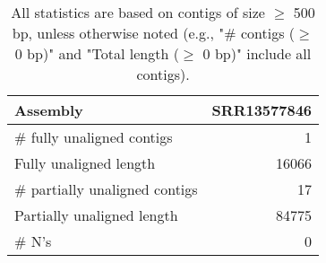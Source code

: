 \documentclass[12pt,a4paper]{article}
\begin{document}
\begin{table}[ht]
\begin{center}
\caption{All statistics are based on contigs of size $\geq$ 500 bp, unless otherwise noted (e.g., "\# contigs ($\geq$ 0 bp)" and "Total length ($\geq$ 0 bp)" include all contigs).}
\begin{tabular}{|l*{1}{|r}|}
\hline
Assembly & SRR13577846 \\ \hline
\# fully unaligned contigs & 1 \\ \hline
Fully unaligned length & 16066 \\ \hline
\# partially unaligned contigs & 17 \\ \hline
Partially unaligned length & 84775 \\ \hline
\# N's & 0 \\ \hline
\end{tabular}
\end{center}
\end{table}
\end{document}
